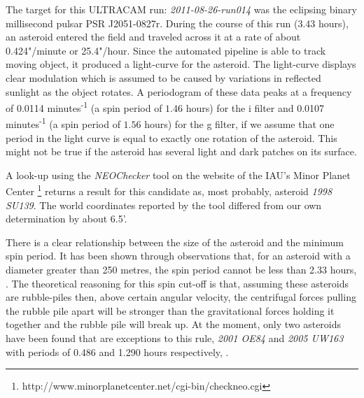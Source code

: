   
The target for this ULTRACAM run: \emph{ 2011-08-26-run014} was the eclipsing binary millisecond pulsar PSR J2051-0827r. During the course of this run (3.43 hours), an asteroid entered the field and traveled across it at a rate of about 0.424"/minute or 25.4"/hour. Since the automated pipeline is able to track moving object, it produced a light-curve for the asteroid. The light-curve displays clear modulation which is assumed to be caused by variations in reflected sunlight as the object rotates. A periodogram of these data peaks at a frequency of 0.0114 minutes\textsuperscript{-1} (a spin period of $1.46$ hours) for the i filter and 0.0107 minutes\textsuperscript{-1} (a spin period of $1.56$ hours) for the g filter, if we assume that one period in the light curve is equal to exactly one rotation of the asteroid. This might not be true if the asteroid has several light and dark patches on its surface. 

A look-up using the \emph{NEOChecker} tool on the website of the IAU's Minor Planet Center \footnote{http://www.minorplanetcenter.net/cgi-bin/checkneo.cgi} returns a result for this candidate as, most probably, asteroid \emph{1998 SU139}. The world coordinates reported by the tool differed from our own determination by about 6.5'. 

There is a clear relationship between the size of the asteroid and the minimum spin period. It has been shown through observations that, for an asteroid with a diameter greater than 250 metres, the spin period cannot be less than 2.33 hours, \citep{Jacobson2014}. The theoretical reasoning for this spin cut-off is that, assuming these asteroids are rubble-piles then, above certain angular velocity, the centrifugal forces pulling the rubble pile apart will be stronger than the gravitational forces holding it together and the rubble pile will break up. At the moment, only two asteroids have been found that are exceptions to this rule, \emph{2001 OE84} and \emph{2005 UW163} with periods of 0.486 and 1.290 hours respectively, \citep{Chang2014}. 


